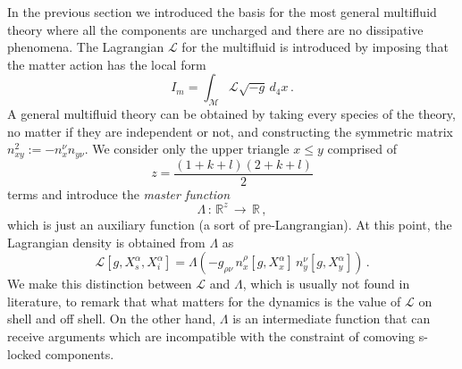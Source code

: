 \documentclass[usenatbib]{mnras}
\begin{document}
%
In the previous section we introduced the basis for the most general multifluid theory where all the components are uncharged and there are no dissipative phenomena. The Lagrangian $\mathcal{L}$ for the multifluid is introduced by imposing that the matter action has the local  form
%
\begin{equation}
\label{matteraction}
I_m = \int_\mathcal{M} \mathcal{L} \sqrt{-g} \, d_4 x \, .
\end{equation}
%
A general multifluid theory can be obtained by taking every species of the theory, no matter if they are independent or not, and constructing the symmetric matrix $n_{xy}^2:= -n_x^\nu n_{y\nu}$. 
We consider only the upper triangle $x \leq y$ comprised of 
%
\begin{equation}
z=\dfrac{(1+k+l)(2+k+l)}{2}
\end{equation} 
%
terms and introduce the  \emph{master function}
%
\begin{equation}
\Lambda \, : \, \mathbb{R}^z \, \longrightarrow \, \mathbb{R} \, ,
\end{equation} 
%
which is just an auxiliary function (a sort of pre-Langrangian).
At this point, the Lagrangian density is obtained from $\Lambda$ as
%
\begin{equation}
\label{ilbuglagrangiano}
\mathcal{L}[  g  , X_s^\alpha  , X^\alpha_{i}  ]
= 
\Lambda ( -g_{\rho \nu} \, n_x^\rho[ g  , X_x^\alpha  ] \, n_y^\nu[  g  , X_y^\alpha  ] ) 
\, .
\end{equation}
%
We make this distinction between $\mathcal{L}$ and $\Lambda$, which is usually not found in literature, to remark that what matters for the dynamics is the value of $\mathcal{L}$ on shell and off shell. On the other hand,  
$\Lambda$ is an intermediate function that can receive arguments which are incompatible with the constraint of comoving s-locked components. 
\end{document}
